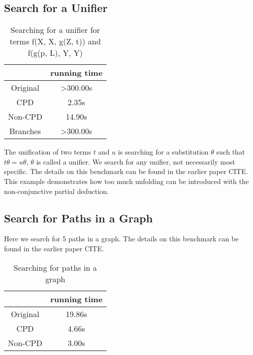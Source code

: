 \subsection{Search for a Unifier}

\begin{table}
  \centering
  \begin{tabular}{c|c}

    & running time \\
  \hline\hline
  Original         & >300.00s \\
  \hline
  CPD              & 2.35s \\
  \hline
  Non-CPD          & 14.90s \\
  \hline
  Branches         & >300.00s \\
  \hline
  \end{tabular}

  \caption{Searching for a unifier for terms f(X, X, g(Z, t)) and f(g(p, L), Y, Y)}
  \label{tbl:unify}
\end{table}

The unification of two terms $t$ and $u$ is searching for a substitution $\theta$ such that $t \theta = u \theta$, $\theta$ is called a unifier.
We search for any unifier, not necessarily most specific.
The details on this benchmark can be found in the earlier paper CITE.
This example demonstrates how too much unfolding can be introduced with the non-conjunctive partial deduction.

\subsection{Search for Paths in a Graph}

Here we search for 5 paths in a graph.
The details on this benchmark can be found in the earlier paper CITE.

\begin{table}
  \centering
  \begin{tabular}{c|c}

    & running time \\
  \hline\hline
  Original         & 19.86s \\
  \hline
  CPD              & 4.66s \\
  \hline
  Non-CPD          & 3.00s \\
  \hline
  \end{tabular}

  \caption{Searching for paths in a graph}
  \label{tbl:unify}
\end{table}

